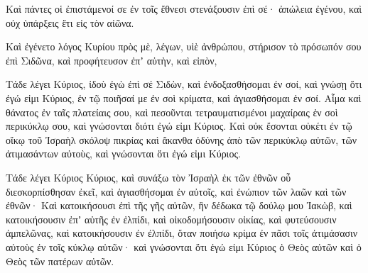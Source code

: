 {Καὶ πάντες οἱ ἐπιστάμενοί σε ἐν τοῖς ἔθνεσι στενάξουσιν ἐπὶ σέ· ἀπώλεια ἐγένου, καὶ οὐχ ὑπάρξεις ἔτι εἰς τὸν αἰῶνα.
\par }{\PP {}Καὶ ἐγένετο λόγος Κυρίου πρὸς μὲ, λέγων,
υἱὲ ἀνθρώπου, στήρισον τὸ πρόσωπόν σου ἐπὶ Σιδῶνα, καὶ προφήτευσον ἐπʼ αὐτὴν,
καὶ εἰπὸν,
\par }{\PP Τάδε λέγει Κύριος, ἰδοὺ ἐγὼ ἐπὶ σέ Σιδὼν, καὶ ἐνδοξασθήσομαι ἐν σοί, καὶ γνώσῃ ὅτι ἐγώ εἰμι Κύριος, ἐν τῷ ποιῆσαί με ἐν σοὶ κρίματα, καὶ ἁγιασθήσομαι ἐν σοί.
Αἷμα καὶ θάνατος ἐν ταῖς πλατείαις σου, καὶ πεσοῦνται τετραυματισμένοι μαχαίραις ἐν σοὶ περικύκλῳ σου, καὶ γνώσονται διότι ἐγώ εἰμι Κύριος.
Καὶ οὐκ ἔσονται οὐκέτι ἐν τῷ οἴκῳ τοῦ Ἰσραὴλ σκόλοψ πικρίας καὶ ἄκανθα ὀδύνης ἀπὸ τῶν περικύκλῳ αὐτῶν, τῶν ἀτιμασάντων αὐτοὺς, καὶ γνώσονται ὅτι ἐγώ εἰμι Κύριος.
\par }{\PP {}Τάδε λέγει Κύριος Κύριος, καὶ συνάξω τὸν Ἰσραὴλ ἐκ τῶν ἐθνῶν οὗ διεσκορπίσθησαν ἐκεῖ, καὶ ἁγιασθήσομαι ἐν αὐτοῖς, καὶ ἐνώπιον τῶν λαῶν καὶ τῶν ἐθνῶν·
Καὶ κατοικήσουσι ἐπὶ τῆς γῆς αὐτῶν, ἣν δέδωκα τῷ δούλῳ μου Ἰακὼβ, καὶ κατοικήσουσιν ἐπʼ αὐτῆς ἐν ἐλπίδι, καὶ οἰκοδομήσουσιν οἰκίας, καὶ φυτεύσουσιν ἀμπελῶνας, καὶ κατοικήσουσιν ἐν ἐλπίδι, ὅταν ποιήσω κρίμα ἐν πᾶσι τοῖς ἀτιμάσασιν αὐτοὺς ἐν τοῖς κύκλῳ αὐτῶν· καὶ γνώσονται ὅτι ἐγώ εἰμι Κύριος ὁ Θεὸς αὐτῶν καὶ ὁ Θεὸς τῶν πατέρων αὐτῶν.

}
